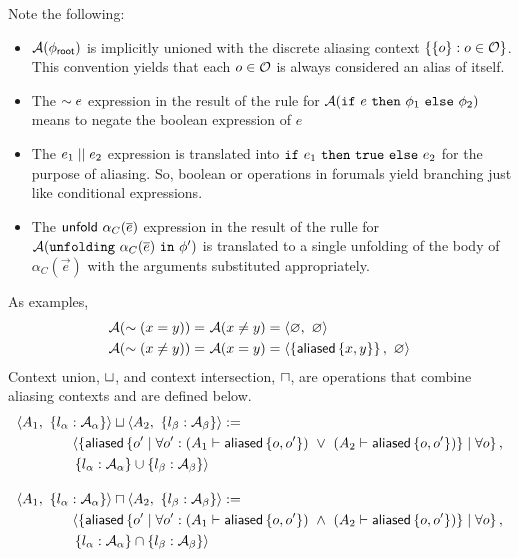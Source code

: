 %
Note the following:
\begin{itemize}
  \item $\mathcal{A}({\phi_\textsf{root}})$ is implicitly unioned with the discrete aliasing context $\left\{  \left\{ o \right\} : o \in \mathcal{O}  \right\}$. This convention yields that each $o \in \mathcal{O}$ is always considered an alias of itself.
  \item The $\sim e$ expression in the result of the rule for $\mathcal{A}(\texttt{if} \ e \ \texttt{then} \ \phi_1 \ \texttt{else} \ \phi_2)$ means to negate the boolean expression of $e$
  \item The $e_1 \mid\mid e_2$ expression is translated into $\texttt{if} \ e_1 \ \texttt{then} \ \texttt{true} \ \texttt{else} \ e_2$ for the purpose of aliasing. So, boolean or operations in forumals yield branching just like conditional expressions.
  \item The $\textsf{unfold} \ \alpha_C(\overline{e})$ expression in the result of the rulle for $\mathcal{A}(\texttt{unfolding} \ \alpha_C(\overline{e}) \ \texttt{in} \ \phi^\prime)$ is translated to a single unfolding of the body of $\alpha_C(\vec{e})$ with the arguments substituted appropriately.
\end{itemize}
As examples,
\begin{align*}
  \mathcal{A}( \sim (x =   y) ) = & \ \mathcal{A}(x \neq y) = \langle \varnothing ,\ \varnothing \rangle \\
  \mathcal{A}( \sim (x\neq y) ) = & \ \mathcal{A}(x =    y) = \langle \left\{  \textsf{aliased}\left\{ x,y \right\}  \right\} ,\ \varnothing \rangle
\end{align*}
Context union, $\sqcup$, and context intersection, $\sqcap$, are operations that combine aliasing contexts and are defined below.
%
\begin{align*}
&
\context{A_1}{\set{ l_\alpha : \A_\alpha }} \contextunion
\context{A_2}{\set{ l_\beta : \A_\beta }} :=
\\ & \hspace{4em}
\langle
  \set{
    \aliased\set{
      o\p
      \mid
      \forall o\p :
      (A_1 \entails \aliased\set{o, o\p}) \ \lor \
      (A_2 \entails \aliased\set{o, o\p}) }
    \mid
    \forall o
  },
\\ & \hspace{4em}
  \set{ l_\alpha : \A_\alpha } \cup \set{ l_\beta : \A_\beta }
\rangle
%
\\[1em]
%
&
\context{A_1}{\set{ l_\alpha : \A_\alpha }} \contextintersection
\context{A_2}{\set{ l_\beta : \A_\beta }} :=
\\ & \hspace{4em}
\langle
  \set{
    \aliased\set{
      o\p
      \mid
      \forall o\p :
      (A_1 \entails \aliased\set{o, o\p}) \ \land \
      (A_2 \entails \aliased\set{o, o\p}) }
    \mid
    \forall o
  },
\\ & \hspace{4em}
  \set{ l_\alpha : \A_\alpha } \cap \set{ l_\beta : \A_\beta }
\rangle
\end{align*}

